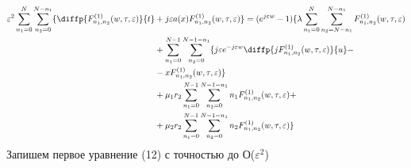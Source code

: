 \begin{equation}
\begin{split}
		\varepsilon^{2}\sum_{n_1=0}^N\sum_{n_2=0}^{N-n_1}\{ \diffp{F_{n_1,n_2}^{(1)}(w,\tau,\varepsilon)}{t}&+j\varepsilon a(x) F_{n_1,n_2}^{(1)}(w,\tau,\varepsilon)\}=
		(e^{j\varepsilon w} - 1)\{\lambda \sum_{n_1=0}^N\sum_{n_2=N-n_1}^{N-n_1} 
		F_{n_1, n_2}^{(1)}(w,\tau,\varepsilon)\\
		&+\sum_{n_1=0}^{N-1}\sum_{n_2=0}^{N-1-n_1} 
		\{ j \varepsilon e^{-j\varepsilon w}\diffp{j F_{n_1, n_2}^{(1)}(w,\tau,\varepsilon)}{u}-\\
		&-xF_{n_1, n_2}^{(1)}(w,\tau,\varepsilon)\}\\
		&+\mu_1 r_2 \sum_{n_1=0}^{N-1}\sum_{n_2=0}^{N-1-n_1} 
		n_1 F_{n_1, n_2}^{(1)}(w,\tau,\varepsilon)+\\
		&+\mu_2 r_2 \sum_{n_1=0}^{N-1}\sum_{n_2=0}^{N-1-n_1} 
		n_2 F_{n_1, n_2}^{(1)}(w,\tau,\varepsilon)\}\
	\end{split}
\end{equation}
 Запишем первое уравнение (12) с точностью до О($\varepsilon^2$)
